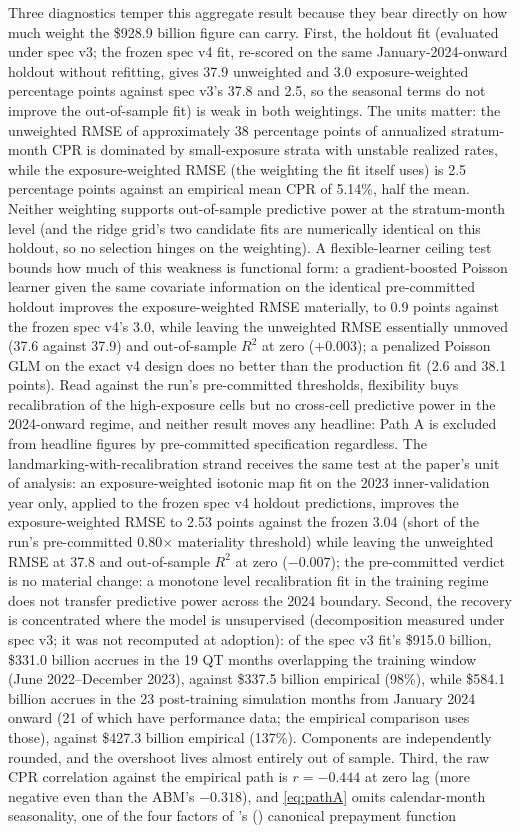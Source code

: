 \documentclass[12pt]{article}
\newcommand{\citepos}[1]{\citeauthor{#1}'s (\citeyear{#1})}
\begin{document}
Three diagnostics temper this aggregate result because they bear directly on how much weight the \$928.9 billion figure can carry. First, the holdout fit (evaluated under spec v3; the frozen spec v4 fit, re-scored on the same January-2024-onward holdout without refitting, gives 37.9 unweighted and 3.0 exposure-weighted percentage points against spec v3's 37.8 and 2.5, so the seasonal terms do not improve the out-of-sample fit) is weak in both weightings. The units matter: the unweighted RMSE of approximately 38 percentage points of annualized stratum-month CPR is dominated by small-exposure strata with unstable realized rates, while the exposure-weighted RMSE (the weighting the fit itself uses) is 2.5 percentage points against an empirical mean CPR of 5.14\%, half the mean. Neither weighting supports out-of-sample predictive power at the stratum-month level (and the ridge grid's two candidate fits are numerically identical on this holdout, so no selection hinges on the weighting). A flexible-learner ceiling test bounds how much of this weakness is functional form: a gradient-boosted Poisson learner given the same covariate information on the identical pre-committed holdout improves the exposure-weighted RMSE materially, to 0.9 points against the frozen spec v4's 3.0, while leaving the unweighted RMSE essentially unmoved (37.6 against 37.9) and out-of-sample $R^2$ at zero ($+0.003$); a penalized Poisson GLM on the exact v4 design does no better than the production fit (2.6 and 38.1 points). Read against the run's pre-committed thresholds, flexibility buys recalibration of the high-exposure cells but no cross-cell predictive power in the 2024-onward regime, and neither result moves any headline: Path A is excluded from headline figures by pre-committed specification regardless. The landmarking-with-recalibration strand receives the same test at the paper's unit of analysis: an exposure-weighted isotonic map fit on the 2023 inner-validation year only, applied to the frozen spec v4 holdout predictions, improves the exposure-weighted RMSE to 2.53 points against the frozen 3.04 (short of the run's pre-committed 0.80$\times$ materiality threshold) while leaving the unweighted RMSE at 37.8 and out-of-sample $R^2$ at zero ($-0.007$); the pre-committed verdict is no material change: a monotone level recalibration fit in the training regime does not transfer predictive power across the 2024 boundary. Second, the recovery is concentrated where the model is unsupervised (decomposition measured under spec v3; it was not recomputed at adoption): of the spec v3 fit's \$915.0 billion, \$331.0 billion accrues in the 19 QT months overlapping the training window (June 2022--December 2023), against \$337.5 billion empirical (98\%), while \$584.1 billion accrues in the 23 post-training simulation months from January 2024 onward (21 of which have performance data; the empirical comparison uses those), against \$427.3 billion empirical (137\%). Components are independently rounded, and the overshoot lives almost entirely out of sample. Third, the raw CPR correlation against the empirical path is $r = -0.444$ at zero lag (more negative even than the ABM's $-0.318$), and \eqref{eq:pathA} omits calendar-month seasonality, one of the four factors of \citepos{richard1989} canonical prepayment function 
\end{document}
